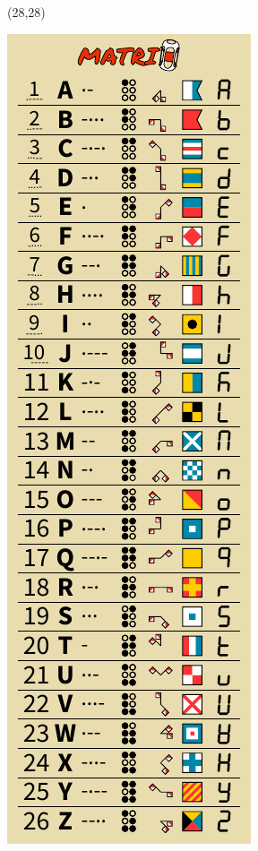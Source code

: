 \documentclass{extarticle}
\begin{document}
\pagestyle{empty}


\begin{textblock}{42}(28,28)
\vfill
{\centerline{\includegraphics[scale=1,]{front.pdf}}} 
\vfill
\end{textblock}
\end{document}
